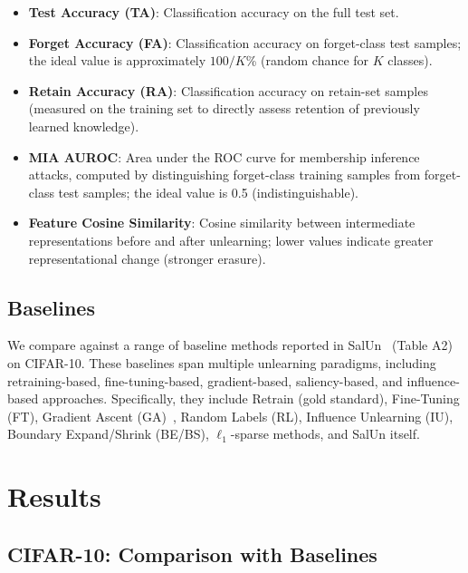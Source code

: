 \documentclass[10pt,twocolumn]{article}
\begin{document}
\begin{itemize}[nosep,leftmargin=*]
  \item \textbf{Test Accuracy (TA)}: Classification accuracy on the full test set.
  
  \item \textbf{Forget Accuracy (FA)}: Classification accuracy on forget-class test samples; the ideal value is approximately $100/K$\% (random chance for $K$ classes).
  
  \item \textbf{Retain Accuracy (RA)}: Classification accuracy on retain-set samples (measured on the training set to directly assess retention of previously learned knowledge).
  
  \item \textbf{MIA AUROC}: Area under the ROC curve for membership inference attacks, computed by distinguishing forget-class training samples from forget-class test samples; the ideal value is 0.5 (indistinguishable).
  
  \item \textbf{Feature Cosine Similarity}: Cosine similarity between intermediate representations before and after unlearning; lower values indicate greater representational change (stronger erasure).
\end{itemize}

\subsection{Baselines}

We compare against a range of baseline methods reported in SalUn~\cite{fan2024salun} (Table A2) on CIFAR-10.
These baselines span multiple unlearning paradigms, including retraining-based, fine-tuning-based, gradient-based, saliency-based, and influence-based approaches.
Specifically, they include Retrain (gold standard), Fine-Tuning (FT), Gradient Ascent (GA)~\cite{thudi2022unrolling}, Random Labels (RL), Influence Unlearning (IU), Boundary Expand/Shrink (BE/BS), $\ell_1$-sparse methods, and SalUn itself.
\section{Results}
\label{sec:results}

\subsection{CIFAR-10: Comparison with Baselines}
\end{document}
